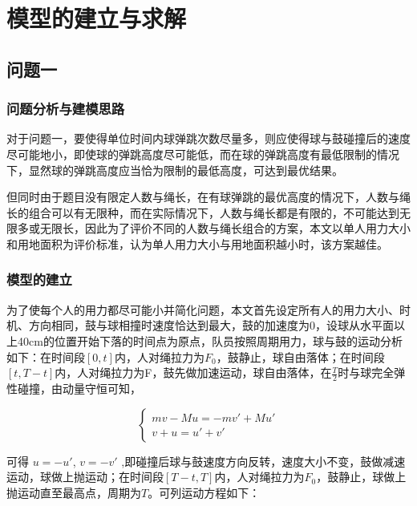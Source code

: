 \documentclass[withoutpreface,bwprint]{cumcmthesis} %
\begin{document}
\section{模型的建立与求解}

\subsection{问题一}
	\subsubsection{问题分析与建模思路}
对于问题一，要使得单位时间内球弹跳次数尽量多，则应使得球与鼓碰撞后的速度尽可能地小，即使球的弹跳高度尽可能低，而在球的弹跳高度有最低限制的情况下，显然球的弹跳高度应当恰为限制的最低高度，可达到最优结果。
\par
但同时由于题目没有限定人数与绳长，在有球弹跳的最优高度的情况下，人数与绳长的组合可以有无限种，而在实际情况下，人数与绳长都是有限的，不可能达到无限多或无限长，因此为了评价不同的人数与绳长组合的方案，本文以单人用力大小和用地面积为评价标准，认为单人用力大小与用地面积越小时，该方案越佳。

	\subsubsection{模型的建立}
为了使每个人的用力都尽可能小并简化问题，本文首先设定所有人的用力大小、时机、方向相同，鼓与球相撞时速度恰达到最大，鼓的加速度为0，设球从水平面以上40cm的位置开始下落的时间点为原点，队员按照周期用力，球与鼓的运动分析如下：在时间段$\left [ 0,t \right ]$内，人对绳拉力为$F_0$，鼓静止，球自由落体；在时间段$\left [ t,T-t \right ] $内，人对绳拉力为F，鼓先做加速运动，球自由落体，在$\frac{T}{2}$时与球完全弹性碰撞，由动量守恒可知，

\begin{equation}
\begin{cases}


mv-Mu=-m{v}'+M{u}'    \\
	v+u={u}'+{v}' 

\end{cases}
\end{equation}


可得 $u=-{u}'$, $v=-{v}'$ ,即碰撞后球与鼓速度方向反转，速度大小不变，鼓做减速运动，球做上抛运动；在时间段$ \left [ T-t,T \right ]$内，人对绳拉力为$F_0$，鼓静止，球做上抛运动直至最高点，周期为$T$。可列运动方程如下：
\end{document}
